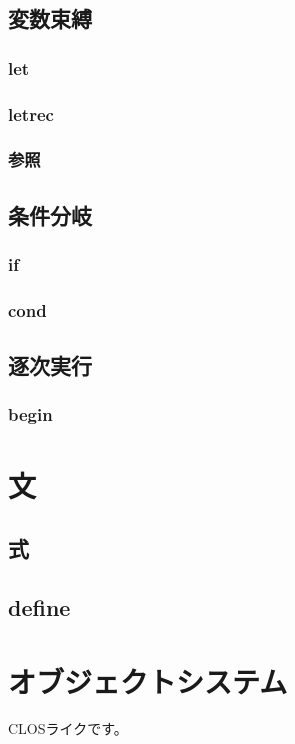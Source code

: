 \documentclass[draft]{article}
\begin{document}
\subsection{変数束縛}
\subsubsection{let}
\subsubsection{letrec}
\subsubsection{参照}

\subsection{条件分岐}
\subsubsection{if}
\subsubsection{cond}

\subsection{逐次実行}
\subsubsection{begin}

\section{文}
\subsection{式}

\subsection{define}

\section{オブジェクトシステム}
CLOSライクです。
\end{document}
